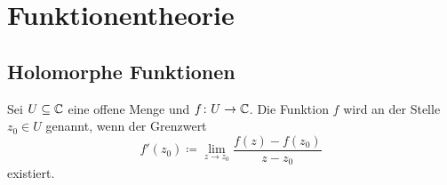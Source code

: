 
\chapter{Funktionentheorie}
\section{Holomorphe Funktionen}

\begin{definition}
Sei $U\subseteq\mathbb C$ eine offene Menge und $f\colon U\to\mathbb C$.
Die Funktion $f$ wird  an der
Stelle $z_0\in U$ genannt, wenn der Grenzwert%
\begin{equation}
f'(z_0)\coloneq \lim_{z\to z_0} \frac{f(z)-f(z_0)}{z-z_0}
\end{equation}
existiert.
\end{definition}

